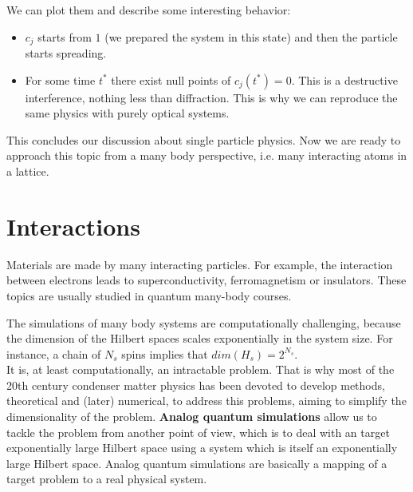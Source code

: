 \noindent We can plot them and describe some interesting behavior:

\begin{minipage}{0.50\textwidth}
\scalebox{1.0}{  }
\end{minipage}\hfill
\begin{minipage}{0.45\textwidth}
\begin{itemize}
    \item $c_{j}$ starts from $1$ (we prepared the system in this state) and then the particle starts spreading.
    \item For some time $t^*$ there exist null points of $c_j(t^*) = 0$. This is a destructive interference, nothing less than diffraction. This is why we can reproduce the same physics with purely optical systems.
\end{itemize}
\end{minipage}



\vspace{1em}

This concludes our discussion about single particle physics. Now we are ready to approach this topic from a many body perspective, i.e. many interacting atoms in a lattice.





\section{Interactions}

Materials are made by many interacting particles. For example, the interaction between electrons leads to superconductivity, ferromagnetism or insulators. These topics are usually studied in quantum many-body courses.

The simulations of many body systems are computationally challenging, because the dimension of the Hilbert spaces scales exponentially in the system size. For instance, a chain of $N_s$ spins implies that $dim(H_s) = 2^{N_s}$.\\

It is, at least computationally, an intractable problem. That is why most of the 20th century condenser matter physics has been devoted to develop methods, theoretical and (later) numerical, to address this problems, aiming to simplify the dimensionality of the problem.
\textbf{Analog quantum simulations} allow us to tackle the problem from another point of view, which is to deal with an target exponentially large Hilbert space using a system which is itself an exponentially large Hilbert space.
Analog quantum simulations are basically a mapping of a target problem to a real physical system.\\

